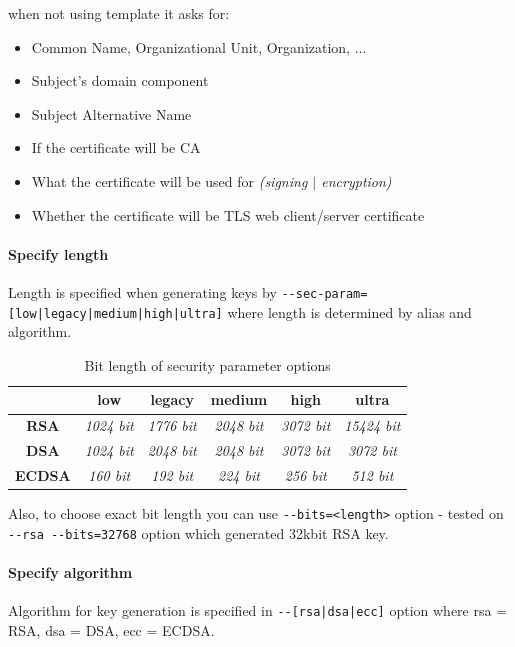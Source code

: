 \documentclass[10pt, a4paper]{report}
\begin{document}
when not using template it asks for:
\begin{itemize}
\item Common Name, Organizational Unit, Organization, ...
\item Subject's domain component
\item Subject Alternative Name
\item If the certificate will be CA
\item What the certificate will be used for \textit{(signing $\vert$ encryption)}
\item Whether the certificate will be TLS web client/server certificate
\end{itemize}

\pagebreak

      \paragraph{Specify length}

Length is specified when generating keys by \verb+--sec-param=[low|legacy|medium|high|ultra]+ where length is determined by alias and algorithm.

\begin{table}[]
\centering
\caption{Bit length of security parameter options}
\label{my-label}
\begin{tabular}{|c|c|c|c|c|c|}
\hline
               & \textbf{low}      & \textbf{legacy}   & \textbf{medium}   & \textbf{high}     & \textbf{ultra}     \\ \hline
\textbf{RSA}   & \textit{1024 bit} & \textit{1776 bit} & \textit{2048 bit} & \textit{3072 bit} & \textit{15424 bit} \\ \hline
\textbf{DSA}   & \textit{1024 bit} & \textit{2048 bit} & \textit{2048 bit} & \textit{3072 bit} & \textit{3072 bit}  \\ \hline
\textbf{ECDSA} & \textit{160 bit}  & \textit{192 bit}  & \textit{224 bit}  & \textit{256 bit}  & \textit{512 bit}   \\ \hline
\end{tabular}
\end{table}

Also, to choose exact bit length you can use \verb+--bits=<length>+ option - tested on \verb+--rsa --bits=32768+ option which generated 32kbit RSA key.

      \paragraph{Specify algorithm}
Algorithm for key generation is specified in \verb+--[rsa|dsa|ecc]+ option where rsa = RSA, dsa = DSA, ecc = ECDSA.
\end{document}
